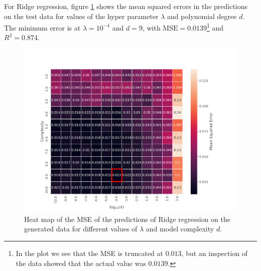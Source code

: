 For Ridge regression, figure \ref{fig:ridge_heatmap_frankie} shows the mean squared errors in the predictions on the test data for values of the hyper parameter $\lambda$ and polynomial degree $d$. The minimum error is at $\lambda = 10^{-4}$ and $d = 9$, with $\text{MSE} = 0.0139$\footnote{In the plot we see that the MSE is truncated at $0.013$, but an inspection of the data showed that the actual value was $0.0139$.} and $R^2 = 0.874$.
\begin{figure}[!h]
    \centering
    \includegraphics[scale=0.6]{Figures/RIDGE/min_mse_heatmap_ridge_003.pdf}
    \caption{Heat map of the MSE of the predictions of Ridge regression on the generated data for different values of $\lambda$ and model complexity $d$.}
    \label{fig:ridge_heatmap_frankie}
\end{figure}
